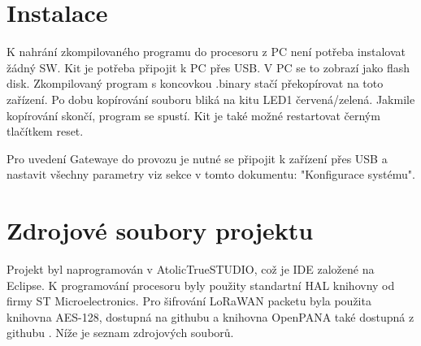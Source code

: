 \section{Instalace}
K nahrání zkompilovaného programu do procesoru z PC není potřeba instalovat žádný SW. 
Kit je potřeba připojit k PC přes USB. V PC se to zobrazí jako flash disk. Zkompilovaný program s koncovkou .binary stačí překopírovat na toto zařízení. Po dobu kopírování souboru bliká na kitu LED1 červená/zelená. Jakmile kopírování skončí, program se spustí. Kit je také možné restartovat černým tlačítkem reset.

 Pro uvedení Gatewaye do provozu je nutné se připojit k zařízení přes USB a nastavit všechny parametry viz sekce v tomto dokumentu: "Konfigurace systému".

\newpage
\section{Zdrojové soubory projektu}
Projekt byl naprogramován v AtolicTrueSTUDIO, což je IDE založené na Eclipse. 
K programování procesoru byly použity standartní HAL knihovny od firmy ST Microelectronics.
Pro šifrování LoRaWAN packetu byla použita knihovna AES-128, dostupná na githubu \cite{AESlib} a knihovna OpenPANA také dostupná z githubu \cite{CMAClib}.
Níže je seznam zdrojových souborů.


